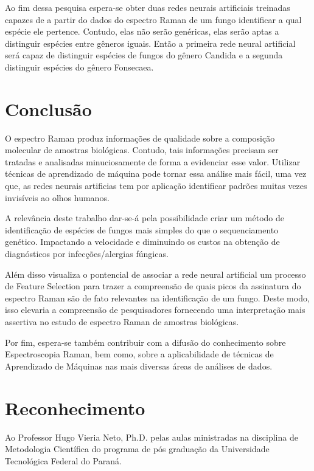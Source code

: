 \documentclass[conference,peerreview]{IEEEtran}
\begin{document}
Ao fim dessa pesquisa espera-se obter duas redes neurais artificiais treinadas capazes de a partir do dados do espectro Raman de um fungo identificar a qual espécie ele pertence. Contudo, elas não serão genéricas, elas serão aptas a distinguir espécies entre gêneros iguais. Então a primeira rede neural artificial será capaz de distinguir espécies de fungos do gênero Candida e a segunda distinguir espécies do gênero Fonsecaea. 

\section{Conclusão}
 
O espectro Raman produz informações de qualidade sobre a composição molecular de amostras biológicas. Contudo, tais informações precisam ser tratadas e analisadas minuciosamente de forma a evidenciar esse valor. Utilizar técnicas de aprendizado de máquina pode tornar essa análise mais fácil, uma vez que, as redes neurais artificias tem por aplicação identificar padrões muitas vezes invisíveis ao olhos humanos.

A relevância deste trabalho dar-se-á pela possibilidade criar um método de identificação de espécies de fungos mais simples do que o sequenciamento genético. Impactando a velocidade e diminuindo os custos na obtenção de diagnósticos por infecções/alergias fúngicas. 

Além disso visualiza o pontencial de associar a rede neural artificial um processo de Feature Selection para trazer a compreensão de quais picos da assinatura do espectro Raman são de fato relevantes na identificação de um fungo. Deste modo, isso elevaria a compreensão de pesquisadores fornecendo uma interpretação mais assertiva no estudo de espectro Raman de amostras biológicas.

Por fim, espera-se também contribuir com a difusão do conhecimento sobre Espectroscopia Raman, bem como, sobre a aplicabilidade de técnicas de Aprendizado de Máquinas nas mais diversas áreas de análises de dados.

\section*{Reconhecimento}

Ao Professor Hugo Vieria Neto, Ph.D. pelas aulas ministradas na disciplina de Metodologia Científica do programa de pós graduação da Universidade Tecnológica Federal do Paraná.



\end{document}
